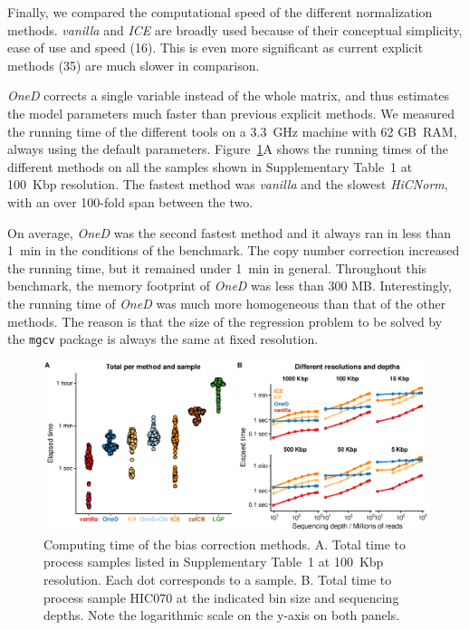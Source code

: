 \documentclass[a4,center,fleqn]{NAR}
\providecommand{\DIFadd}[1]{{\protect\color{red}#1}} %
\providecommand{\DIFdel}[1]{{\protect}}                      %
\providecommand{\DIFaddbegin}{} %
\providecommand{\DIFaddend}{} %
\providecommand{\DIFdelbegin}{} %
\providecommand{\DIFdelend}{} %
\begin{document}
Finally, we compared the computational speed of the different
normalization methods. \textit{vanilla} and \textit{ICE} are broadly used
because of their conceptual simplicity, ease of use and speed
(16). This is even more significant as current
explicit methods (\DIFdelbegin \DIFdel{32}\DIFdelend \DIFaddbegin \DIFadd{35}\DIFaddend ) are much slower in comparison.

\textit{OneD} corrects a single variable instead of the whole matrix, and
thus estimates the model parameters much faster than previous explicit
methods. We measured the running time of the different tools on a 3.3~GHz
machine with 62 GB~RAM, always using the default parameters.
Figure~\ref{fig:times}A shows the running times of the different methods
on all the samples shown in Supplementary \DIFdelbegin \DIFdel{Figure}\DIFdelend \DIFaddbegin \DIFadd{Table}\DIFaddend ~1 at 100~Kbp resolution.
The fastest method was \textit{vanilla} and the slowest \textit{\DIFdelbegin \DIFdel{LGF}\DIFdelend \DIFaddbegin \DIFadd{HiCNorm}\DIFaddend }, with
an over 100-fold span between the two.

On average, \textit{OneD} was the second fastest method and it always ran in less than
1~min in the conditions of the benchmark. The copy number correction
increased the running time, but it remained under 1~min in general.
Throughout this benchmark, the memory footprint of \textit{OneD} was less
than 300 MB.  Interestingly, the running time of \textit{OneD} was much
more homogeneous than that of the other methods. The reason is that the
size of the regression problem to be solved by the \texttt{mgcv} package
is always the same at fixed resolution.

\begin{figure}
\centerline{\includegraphics[width=.49\textwidth]
  {figure_6.eps}}
\caption{Computing time of the bias correction methods. A. Total time to
process samples listed in Supplementary Table~1 at 100~Kbp resolution.
Each dot corresponds to a sample. B. Total time to process sample HIC070
at the indicated bin size and sequencing depths. Note the logarithmic
scale on the y-axis on both panels.}
\label{fig:times}
\end{figure}
\end{document}
